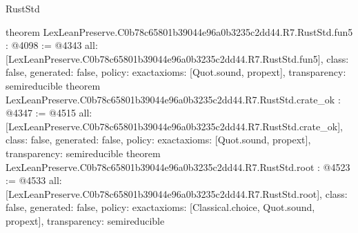 \begin{lexlean}{RustStd}
\begin{coremodule}
{}
theorem LexLeanPreserve.C0b78c65801b39044e96a0b3235c2dd44.R7.RustStd.fun5 : @4098 := @4343 {
  all: [LexLeanPreserve.C0b78c65801b39044e96a0b3235c2dd44.R7.RustStd.fun5],
  class: false,
  generated: false,
  policy: exact{axioms: [Quot.sound, propext]},
  transparency: semireducible
}
theorem LexLeanPreserve.C0b78c65801b39044e96a0b3235c2dd44.R7.RustStd.crate_ok : @4347 := @4515 {
  all: [LexLeanPreserve.C0b78c65801b39044e96a0b3235c2dd44.R7.RustStd.crate_ok],
  class: false,
  generated: false,
  policy: exact{axioms: [Quot.sound, propext]},
  transparency: semireducible
}
theorem LexLeanPreserve.C0b78c65801b39044e96a0b3235c2dd44.R7.RustStd.root : @4523 := @4533 {
  all: [LexLeanPreserve.C0b78c65801b39044e96a0b3235c2dd44.R7.RustStd.root],
  class: false,
  generated: false,
  policy: exact{axioms: [Classical.choice, Quot.sound, propext]},
  transparency: semireducible
}


\end{coremodule}
\end{lexlean}

